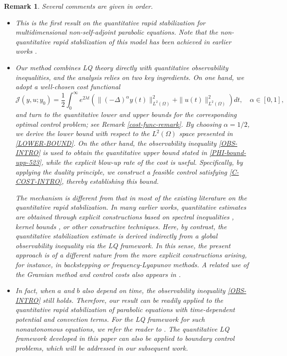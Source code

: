 \documentclass[a4paper]{article}
\newtheorem{remark}[theorem]{Remark}
\numberwithin{equation}{section}
\begin{document}
\begin{remark}\label{Remark-first-1}	
Several comments are given in order.
\begin{itemize}
\item[1.] This is the first result on the quantitative rapid stabilization for multidimensional non-self-adjoint parabolic equations. Note that the non-quantitative rapid stabilization of this model has been achieved in earlier works \cite{BT2, BW}.

\item[2.] Our method combines LQ theory directly with quantitative observability inequalities, and the analysis relies on two key ingredients. On one hand, we adopt a well-chosen cost functional
\begin{equation}\label{Func-alpha}
\mathcal J(y,u;y_0)=\frac12 \int_0^\infty e^{2\lambda t}\left(\|(-\Delta)^{\alpha} y(t)\|_{L^2(\Omega)}^2+\|u(t)\|_{L^2(\Omega)}^2\right)dt,\quad \alpha\in [0,1],
\end{equation}
and turn to the quantitative lower and upper bounds for the corresponding optimal control problem; {see Remark \ref{cost-func-remark}}. By choosing $\alpha=1/2$, we derive the lower bound with respect to the $L^2(\Omega)$ space presented in \eqref{LOWER-BOUND}. On the other hand, the observability inequality \eqref{OBS-INTRO} is used to obtain the quantitative upper bound stated in \eqref{PHI-bound-upp-523}, while the explicit blow-up rate of the cost is useful. Specifically, by applying the duality principle, we construct a  {feasible} control satisfying \eqref{C-COST-INTRO}, thereby establishing this bound.

The mechanism is different from that in most of the existing literature on the quantitative rapid stabilization. In many earlier works, quantitative estimates are obtained through explicit constructions based on spectral inequalities \cite{X1,X2}, kernel bounds \cite{CN,GHMXZ}, or other constructive techniques. Here, by contrast, the quantitative stabilization estimate is derived indirectly from a global observability inequality via the LQ framework. In this sense, the present approach is of a different nature from the more explicit constructions arising, for instance, in backstepping or frequency-Lyapunov methods. A related use of the Gramian method and control costs also appears in \cite{Nyu}.

\item[3.] In fact, when $a$ and $b$ also depend on time, the observability inequality \eqref{OBS-INTRO} still holds. Therefore, our result can be readily applied to the quantitative rapid stabilization of parabolic equations with time-dependent potential and convection terms. For the LQ framework for such nonautonomous equations, we refer the reader to \cite{BR}. The quantitative LQ framework developed in this paper can also be applied to boundary control problems, which will be addressed in our subsequent work. 
\end{itemize} 
\end{remark}
\end{document}

